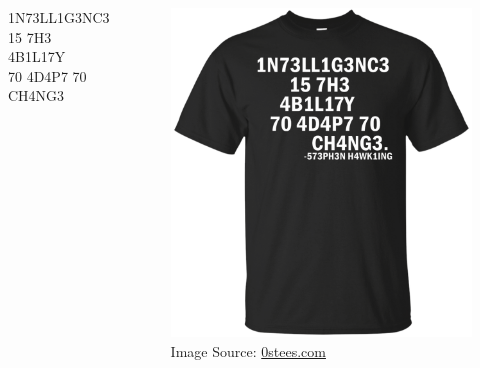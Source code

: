 \begin{frame}[standout]
  \begin{columns}
    \centering
    1N73LL1G3NC3 \\
    15 7H3 \\
    4B1L17Y \\
    70 4D4P7 70 \\
    CH4NG3
    \pause
    \begin{figure}
      \centering
      \includegraphics[height=\textwidth]{figures/shirt.png}
      \caption{\color{white} Image Source: \href{https://www.0stees.com/products/intelligence-is-the-ability-to-adapt-to-change-shirt-hoodie-tank?variant=40350207242}{0stees.com}}
    \end{figure}
  \end{columns}
\end{frame}

